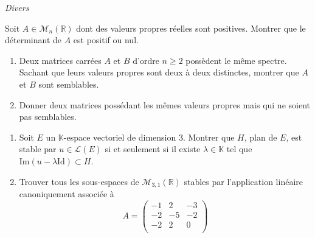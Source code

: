 \documentclass[a4paper,10pt]{report}
\begin{document}
\medskip

\begin{center}
\textit{{ {\large Divers}}}
\end{center}

\medskip

\begin{Exa} Soit $A \in \mathcal{M}_{n}(\mathbb{R})$ dont des valeurs propres réelles sont positives. Montrer que le déterminant de $A$ est positif ou nul.
\end{Exa} 




\begin{Exa}
\begin{enumerate}
\item Deux matrices carrées $A$ et $B$ d'ordre $n \geq 2$ possèdent le même spectre. Sachant que leurs valeurs propres sont deux à deux distinctes, montrer que $A$ et $B$ sont semblables.
\item Donner deux matrices possédant les mêmes valeurs propres mais qui ne soient pas semblables.
\end{enumerate}
\end{Exa} 





\begin{Exa}[\ding{80}] \begin{enumerate}
\item Soit $E$ un $\mathbb{K}$-espace vectoriel de dimension $3$. Montrer que $H$, plan de $E$, est stable par $u \in \mathcal{L}(E)$ si et seulement si il existe $\lambda \in \mathbb{K}$ tel que $\textrm{Im}(u- \lambda \textrm{Id}) \subset H$.
\item Trouver tous les sous-espaces de $\mathcal{M}_{3,1}(\mathbb{R})$ stables par l'application linéaire canoniquement associée à 
$$A= \begin{pmatrix}
-1 & 2 & -3 \\
-2 & -5 & -2 \\
-2 & 2 & 0 \\
\end{pmatrix} $$
\end{enumerate}
\end{Exa}
\end{document}
